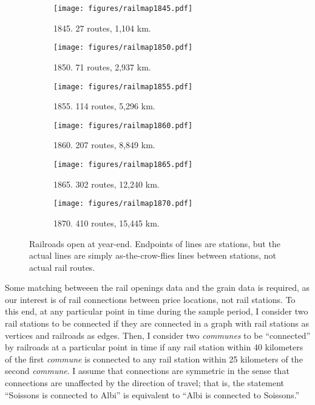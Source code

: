 \documentclass[12pt,twoside]{article}
\begin{document}
\begin{figure}[p]
	\centering
	\begin{subfigure}[t]{0.45\textwidth}
		\centering
		\caption{1845. 27 routes, 1,104 km.}
		\texttt{[image: figures/railmap1845.pdf]}
	\end{subfigure}
	\begin{subfigure}[t]{0.45\textwidth}
		\centering
		\caption{1850. 71 routes, 2,937 km.}
		\texttt{[image: figures/railmap1850.pdf]}
	\end{subfigure}
	\begin{subfigure}[t]{0.45\textwidth}
		\centering
		\caption{1855. 114 routes, 5,296 km.}
		\texttt{[image: figures/railmap1855.pdf]}
	\end{subfigure}
	\begin{subfigure}[t]{0.45\textwidth}
		\centering
		\caption{1860. 207 routes, 8,849 km.}
		\texttt{[image: figures/railmap1860.pdf]}
	\end{subfigure}
	\begin{subfigure}[t]{0.45\textwidth}
		\centering
		\caption{1865. 302 routes, 12,240 km.}
		\texttt{[image: figures/railmap1865.pdf]}
	\end{subfigure}
	\begin{subfigure}[t]{0.45\textwidth}
		\centering
		\caption{1870. 410 routes, 15,445 km.}
		\texttt{[image: figures/railmap1870.pdf]}
	\end{subfigure}
	\caption{Railroads open at year-end. Endpoints of lines are stations, but the actual lines are simply as-the-crow-flies lines between stations, not actual rail routes.}
	\label{fig:rail_openings}
\end{figure}

Some matching betweeen the rail openings data and the grain data is required, as our interest is of rail connections between price locations, not rail stations.
To this end, at any particular point in time during the sample period, I consider two rail stations to be connected if they are connected in a graph with rail stations as vertices and railroads as edges.
Then, I consider two \emph{communes} to be ``connected'' by railroads at a particular point in time if any rail station within 40 kilometers of the first \emph{commune} is connected to any rail station within 25 kilometers of the second \emph{commune}.
I assume that connections are symmetric in the sense that connections are unaffected by the direction of travel; that is, the statement ``Soissons is connected to Albi'' is equivalent to ``Albi is connected to Soissons.''
\end{document}
